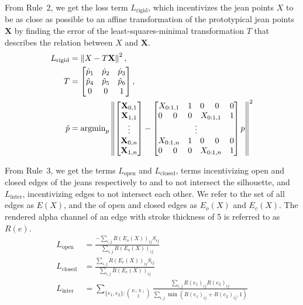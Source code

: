 \documentclass[twocolumn]{article}
\begin{document}
From Rule~2, we get the loss term $L_\text{rigid}$, which incentivizes the jean points $X$ to be as close as possible to an affine transformation of the prototypical jean points $\mathbf{X}$ by finding the error of the least-squares-minimal transformation $T$ that describes the relation between $X$ and $\mathbf{X}$.
\begin{align}
    L_\text{rigid} &= \left\Vert X - T\mathbf{X}\right\Vert^2,\\
    T &= \begin{bmatrix}
        \hat{p}_1 & \hat{p}_2 & \hat{p}_3 \\
        \hat{p}_4 & \hat{p}_5 & \hat{p}_6 \\
        0 & 0 & 1
    \end{bmatrix},\\
    \hat{p} &= \operatorname{argmin}_p \left\Vert
    \begin{bmatrix}\mathbf{X}_{0,1} \\ \mathbf{X}_{1,1} \\ \vdots \\ \mathbf{X}_{0,n} \\ \mathbf{X}_{1,n}\end{bmatrix} -
    \begin{bmatrix}
        \multicolumn{2}{c}{X_{0:1,1}} & 1 & 0 & 0 & 0 \\
        0 & 0 & 0 & \multicolumn{2}{c}{X_{0:1,1}} & 1 \\
         \multicolumn{6}{c}{\vdots} \\
        \multicolumn{2}{c}{X_{0:1,n}} & 1 & 0 & 0 & 0 \\
        0 & 0 & 0 & \multicolumn{2}{c}{X_{0:1,n}} & 1
    \end{bmatrix}
    p
    \right\Vert^2
\end{align}

From Rule~3, we get the terms $L_\text{open}$ and $L_\text{closed}$, terms incentivizing open and closed edges of the jeans respectively to and to not intersect the silhouette, and $L_\text{inter}$, incentivizing edges to not intersect each other. We refer to the set of all edges as $E(X)$, and the of open and closed edges as $E_o(X)$ and $E_c(X)$. The rendered alpha channel of an edge with stroke thickness of 5 is referred to as $R(e)$.
\begin{align}
    L_\text{open} &= \frac{-\sum_{i,j} R(E_o(X))_{ij} S_{ij}}{\sum_{i,j} R(E_o(X))_{ij}} \\
    L_\text{closed} &= \frac{\sum_{i,j} R(E_c(X))_{ij} S_{ij}}{\sum_{i,j} R(E_c(X))_{ij}} \\
    L_\text{inter} &= \sum_{\{e_1, e_2\} : \binom{E(X)}{2}} \frac{\sum_{i,j} R(e_1)_{ij} R(e_2)_{ij}}{ \sum_{i,j} \min{\left( R(e_1)_{ij} + R(e_2)_{ij}, 1 \right)}}
\end{align}
\end{document}
